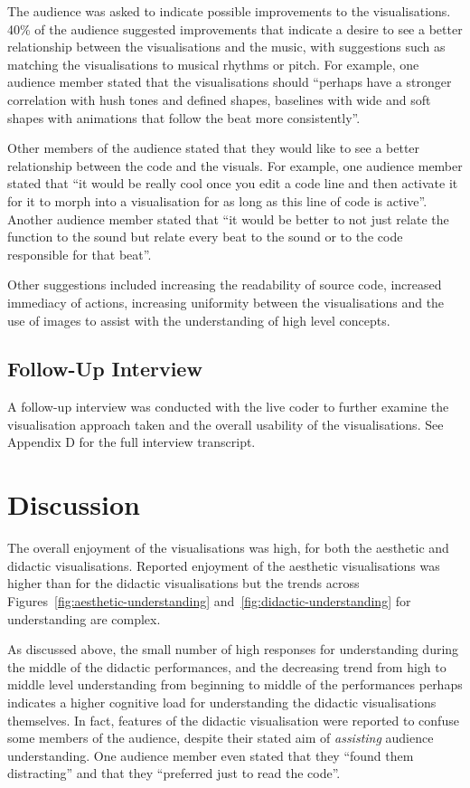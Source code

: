 The audience was asked to indicate possible improvements to the visualisations. 40\% of the audience suggested improvements that indicate a desire to see a better relationship between the visualisations and the music, with suggestions such as matching the visualisations to musical rhythms or pitch. For example, one audience member stated that the visualisations should ``perhaps have a stronger correlation with hush tones and defined shapes, baselines with wide and soft shapes with animations that follow the beat more consistently''.

Other members of the audience stated that they would like to see a better relationship between the code and the visuals. For example, one audience member stated that ``it would be really cool once you edit a code line and then activate it for it to morph into a visualisation for as long as this line of code is active''. Another audience member stated that ``it would be better to not just relate the function to the sound but relate every beat to the sound or to the code responsible for that beat''.

Other suggestions included increasing the readability of source code, increased immediacy of actions, increasing uniformity between the visualisations and the use of images to assist with the understanding of high level concepts.

\subsection{Follow-Up Interview}
\label{section:study-2-follow-up-interview}

A follow-up interview was conducted with the live coder to further examine the visualisation approach taken and the overall usability of the visualisations. See Appendix D for the full interview transcript.

\section{Discussion}
\label{section:user-study-discussion}

The overall enjoyment of the visualisations was high, for both the aesthetic and didactic visualisations. Reported enjoyment of the aesthetic visualisations was higher than for the didactic visualisations but the trends across Figures~\ref{fig:aesthetic-understanding} and~\ref{fig:didactic-understanding} for understanding are complex.

As discussed above, the small number of high responses for understanding during the middle of the didactic performances, and the decreasing trend from high to middle level understanding from beginning to middle of the performances perhaps indicates a higher cognitive load for understanding the didactic visualisations themselves. In fact, features of the didactic visualisation were reported to confuse some members of the audience, despite their stated aim of \emph{assisting} audience understanding. One audience member even stated that they ``found them distracting'' and that they ``preferred just to read the code''.
 
